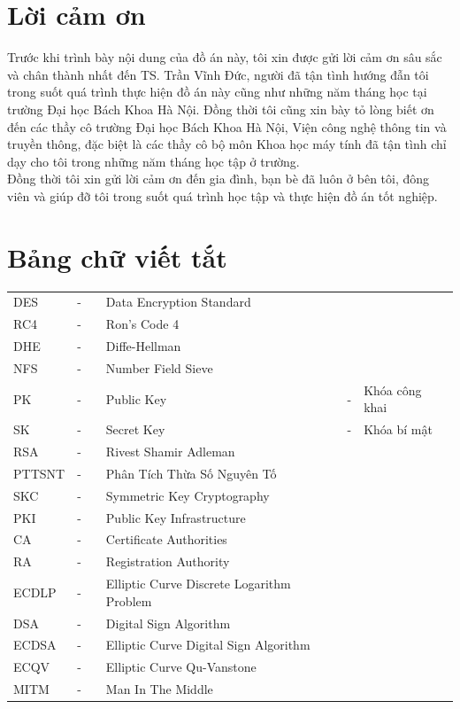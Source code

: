 \documentclass[a4paper,12pt]{report}
\renewcommand{\contentsname}{Mục lục}
\begin{document}
\chapter*{Lời cảm ơn}
Trước khi trình bày nội dung của đồ án này, tôi xin được gửi lời cảm ơn sâu sắc và chân thành nhất đến TS. Trần Vĩnh Đức, người đã tận tình hướng đẫn tôi trong suốt quá trình thực hiện đồ án này cũng như những năm tháng học tại trường Đại học Bách Khoa Hà Nội. Đồng thời tôi cũng xin bày tỏ lòng biết ơn đến các thầy cô trường Đại học Bách Khoa Hà Nội, Viện công nghệ thông tin và truyền thông, đặc biệt là các thầy cô bộ môn Khoa học máy tính đã tận tình chỉ dạy cho tôi trong những năm tháng học tập ở trường. \\ 

Đồng thời tôi xin gửi lời cảm ơn đến gia đình, bạn bè đã luôn ở bên tôi, đông viên và giúp đỡ tôi trong suốt quá trình học tập và thực hiện đồ án tốt nghiệp. 

\newpage
\pdfbookmark{\contentsname}{toc}

\tableofcontents
\newpage
\chapter*{Bảng chữ viết tắt}
\printacronyms[include-classes=abbrev,heading=none]
\begin{tabular}{llllll}
DES & - &  & Data Encryption Standard \\
RC4 & - &  & Ron's Code 4 \\
DHE & - &  & Diffe-Hellman \\
NFS & - &  & Number Field Sieve \\
PK  & - &  & Public Key & - & Khóa công khai \\
SK  & - &  & Secret Key & - & Khóa bí mật \\
RSA & - &  & Rivest Shamir Adleman \\
PTTSNT & - &  & Phân Tích Thừa Số Nguyên Tố \\
SKC & - &  & Symmetric Key Cryptography \\
PKI & - &  & Public Key Infrastructure \\
CA  & - &  & Certificate Authorities \\ 
RA  & - &  & Registration Authority \\
ECDLP & - &  & Elliptic Curve Discrete Logarithm Problem \\
DSA  & - &  & Digital Sign Algorithm \\
ECDSA & - &  & Elliptic Curve Digital Sign Algorithm \\
ECQV & - &  & Elliptic Curve Qu-Vanstone \\
MITM & - &  & Man In The Middle
\end{tabular}
\listoffigures
{}
\end{document}
